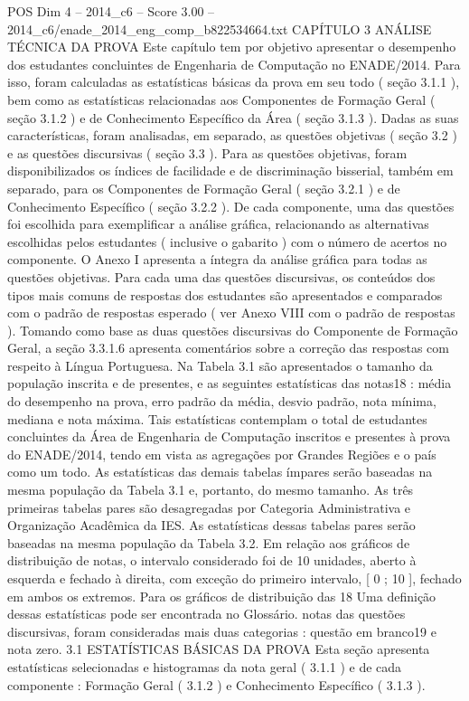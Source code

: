 \begin{textsample}{POS Dim 4 – 2014\_c6 – Score 3.00 – 2014\_c6/enade\_2014\_eng\_comp\_b822534664.txt}  \label{ex:f4_pos_077}
CAPÍTULO 3 ANÁLISE TÉCNICA DA PROVA Este capítulo tem por objetivo apresentar o desempenho dos estudantes concluintes de Engenharia de Computação no ENADE/2014.
Para isso, foram calculadas as estatísticas básicas da prova em seu todo ( seção 3.1.1 ), bem como as estatísticas relacionadas aos Componentes de Formação Geral ( seção 3.1.2 ) e de Conhecimento Específico da Área ( seção 3.1.3 ).
Dadas as suas características, foram analisadas, em separado, as questões objetivas ( seção 3.2 ) e as questões discursivas ( seção 3.3 ).
Para as questões objetivas, foram disponibilizados os índices de facilidade e de discriminação bisserial, também em separado, para os Componentes de Formação Geral ( seção 3.2.1 ) e de Conhecimento Específico ( seção 3.2.2 ).
De cada componente, uma das questões foi escolhida para exemplificar a análise gráfica, relacionando as alternativas escolhidas pelos estudantes ( inclusive o gabarito ) com o número de acertos no componente.
O Anexo I apresenta a íntegra da análise gráfica para todas as questões objetivas.
Para cada uma das questões discursivas, os conteúdos dos tipos mais comuns de respostas dos estudantes são apresentados e comparados com o padrão de respostas esperado ( ver Anexo VIII com o padrão de respostas ).
Tomando como base as duas questões discursivas do Componente de Formação Geral, a seção 3.3.1.6 apresenta comentários sobre a correção das respostas com respeito à Língua Portuguesa.
Na Tabela 3.1 são apresentados o tamanho da população inscrita e de presentes, e as seguintes estatísticas das notas18 : média do desempenho na prova, erro padrão da média, desvio padrão, nota mínima, mediana e nota máxima.
Tais estatísticas contemplam o total de estudantes concluintes da Área de Engenharia de Computação inscritos e presentes à prova do ENADE/2014, tendo em vista as agregações por Grandes Regiões e o país como um todo.
As estatísticas das demais tabelas ímpares serão baseadas na mesma população da Tabela 3.1 e, portanto, do mesmo tamanho.
As três primeiras tabelas pares são desagregadas por Categoria Administrativa e Organização Acadêmica da IES.
As estatísticas dessas tabelas pares serão baseadas na mesma população da Tabela 3.2.
Em relação aos gráficos de distribuição de notas, o intervalo considerado foi de 10 unidades, aberto à esquerda e fechado à direita, com exceção do primeiro intervalo, [ 0 ; 10 ], fechado em ambos os extremos.
Para os gráficos de distribuição das 18 Uma definição dessas estatísticas pode ser encontrada no Glossário. notas das questões discursivas, foram consideradas mais duas categorias : questão em branco19 e nota zero. 3.1 ESTATÍSTICAS BÁSICAS DA PROVA Esta seção apresenta estatísticas selecionadas e histogramas da nota geral ( 3.1.1 ) e de cada componente : Formação Geral ( 3.1.2 ) e Conhecimento Específico ( 3.1.3 ).

\end{textsample}
